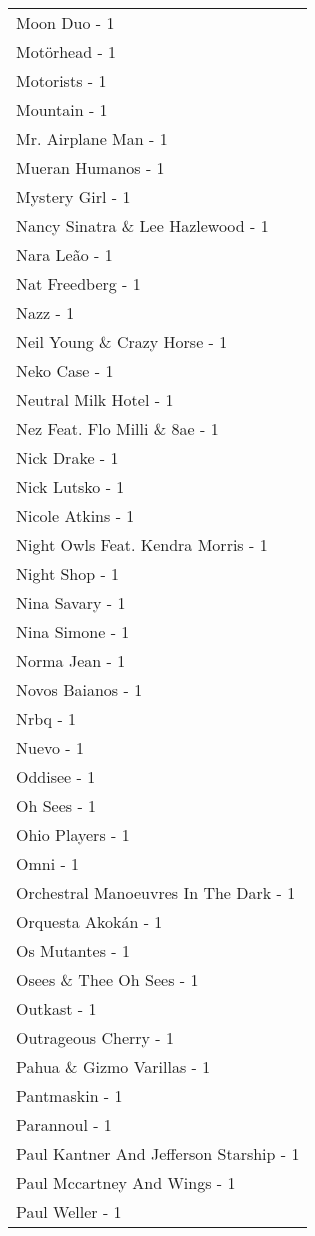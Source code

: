 \documentclass[
]{article}
\begin{document}
\begin{longtable}{l}
Moon Duo - 1 \\ 
Motörhead - 1 \\ 
Motorists - 1 \\ 
Mountain - 1 \\ 
Mr. Airplane Man - 1 \\ 
Mueran Humanos - 1 \\ 
Mystery Girl - 1 \\ 
Nancy Sinatra \& Lee Hazlewood - 1 \\ 
Nara Leão - 1 \\ 
Nat Freedberg - 1 \\ 
Nazz - 1 \\ 
Neil Young \& Crazy Horse - 1 \\ 
Neko Case - 1 \\ 
Neutral Milk Hotel - 1 \\ 
Nez Feat. Flo Milli \& 8ae - 1 \\ 
Nick Drake - 1 \\ 
Nick Lutsko - 1 \\ 
Nicole Atkins - 1 \\ 
Night Owls Feat. Kendra Morris - 1 \\ 
Night Shop - 1 \\ 
Nina Savary - 1 \\ 
Nina Simone - 1 \\ 
Norma Jean - 1 \\ 
Novos Baianos - 1 \\ 
Nrbq - 1 \\ 
Nuevo - 1 \\ 
Oddisee - 1 \\ 
Oh Sees - 1 \\ 
Ohio Players - 1 \\ 
Omni - 1 \\ 
Orchestral Manoeuvres In The Dark - 1 \\ 
Orquesta Akokán - 1 \\ 
Os Mutantes - 1 \\ 
Osees \& Thee Oh Sees - 1 \\ 
Outkast - 1 \\ 
Outrageous Cherry - 1 \\ 
Pahua \& Gizmo Varillas - 1 \\ 
Pantmaskin - 1 \\ 
Parannoul - 1 \\ 
Paul Kantner And Jefferson Starship - 1 \\ 
Paul Mccartney And Wings - 1 \\ 
Paul Weller - 1 \\ 

\end{longtable}
\end{document}
